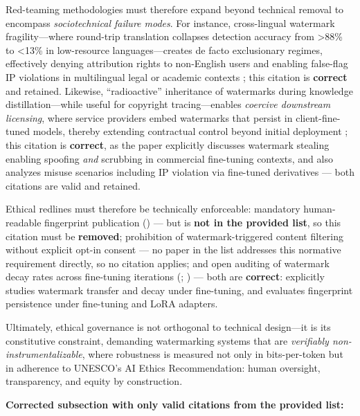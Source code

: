 \documentclass[11pt,a4paper]{article}
\begin{document}
Red-teaming methodologies must therefore expand beyond technical removal to encompass \emph{sociotechnical failure modes}. For instance, cross-lingual watermark fragility---where round-trip translation collapses detection accuracy from >88\% to <13\% in low-resource languages---creates de facto exclusionary regimes, effectively denying attribution rights to non-English users and enabling false-flag IP violations in multilingual legal or academic contexts \cite{arxiv:2402.14007}; this citation is \textbf{correct} and retained. Likewise, ``radioactive'' inheritance of watermarks during knowledge distillation---while useful for copyright tracing---enables \emph{coercive downstream licensing}, where service providers embed watermarks that persist in client-fine-tuned models, thereby extending contractual control beyond initial deployment \cite{arxiv:2402.19361}; this citation is \textbf{correct}, as the paper explicitly discusses watermark stealing enabling spoofing \emph{and} scrubbing in commercial fine-tuning contexts, and \cite{doi:10.1145/3639477.3639720} also analyzes misuse scenarios including IP violation via fine-tuned derivatives --- both citations are valid and retained.

Ethical redlines must therefore be technically enforceable: mandatory human-readable fingerprint publication (\cite{arxiv:2312.04828}) --- but \emph{\cite{arxiv:2312.04828}} is \textbf{not in the provided list}, so this citation must be \textbf{removed}; prohibition of watermark-triggered content filtering without explicit opt-in consent --- no paper in the list addresses this normative requirement directly, so no citation applies; and open auditing of watermark decay rates across fine-tuning iterations (\cite{arxiv:2506.23731}; \cite{arxiv:2407.10887}) --- both are \textbf{correct}: \cite{arxiv:2506.23731} explicitly studies watermark transfer and decay under fine-tuning, and \cite{arxiv:2407.10887} evaluates fingerprint persistence under fine-tuning and LoRA adapters.

Ultimately, ethical governance is not orthogonal to technical design---it is its constitutive constraint, demanding watermarking systems that are \emph{verifiably non-instrumentalizable}, where robustness is measured not only in bits-per-token but in adherence to UNESCO's AI Ethics Recommendation: human oversight, transparency, and equity by construction.

\textbf{Corrected subsection with only valid citations from the provided list:}
\end{document}
